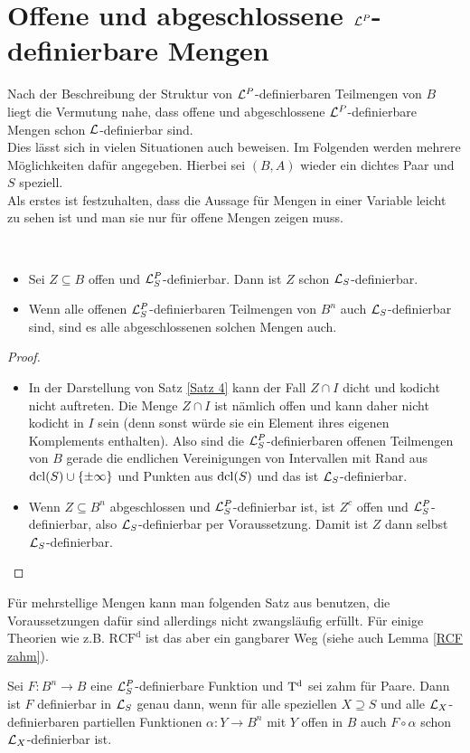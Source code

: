 \section{Offene und abgeschlossene $\mathcal{L}^P$-definierbare Mengen}
Nach der Beschreibung der Struktur von $\mathcal{L}^P$-definierbaren Teilmengen von $B$ liegt die Vermutung nahe, dass offene und abgeschlossene $\mathcal{L}^P$-definierbare Mengen schon $\mathcal{L}$-definierbar sind.\\
Dies lässt sich in vielen Situationen auch beweisen. Im Folgenden werden mehrere Möglichkeiten dafür angegeben. Hierbei sei $(B,A)$ wieder ein dichtes Paar und $S$ speziell.\\
Als erstes ist festzuhalten, dass die Aussage für Mengen in einer Variable leicht zu sehen ist und man sie nur für offene Mengen zeigen muss.
\newpage
\begin{lemma}\label{Offenheit einfache Fälle}\ 
	\begin{itemize}
		\item Sei $Z\subseteq B$ offen und $\mathcal{L}^P_S$-definierbar. Dann ist $Z$ schon $\mathcal{L}_S$-definierbar.
		\item Wenn alle offenen $\mathcal{L}^P_S$-definierbaren Teilmengen von $B^n$ auch $\mathcal{L}_S$-definierbar sind, sind es alle abgeschlossenen solchen Mengen auch.
	\end{itemize}
\end{lemma}
\begin{proof}\ 
	\begin{itemize}
		\item In der Darstellung von Satz \ref{Satz 4} kann der Fall $Z\cap I$ dicht und kodicht nicht auftreten. Die Menge $Z\cap I$ ist nämlich offen und kann daher nicht kodicht in $I$ sein (denn sonst würde sie ein Element ihres eigenen Komplements enthalten). Also sind die $\mathcal{L}^P_S$-definierbaren offenen Teilmengen von $B$ gerade die endlichen Vereinigungen von Intervallen mit Rand aus $\operatorname{dcl}(S)\cup\{\pm\infty\}$ und Punkten aus $\operatorname{dcl}(S)$ und das ist $\mathcal{L}_S$-definierbar.
		\item Wenn $Z\subseteq B^n$ abgeschlossen und $\mathcal{L}^P_S$-definierbar ist, ist $Z^c$ offen und $\mathcal{L}^P_S$-definierbar, also $\mathcal{L}_S$-definierbar per Voraussetzung. Damit ist $Z$ dann selbst $\mathcal{L}_S$-definierbar.
	\end{itemize}
\end{proof}


Für mehrstellige Mengen kann man folgenden Satz aus \cite{Piz} benutzen, die Voraussetzungen dafür sind allerdings nicht zwangsläufig erfüllt. Für einige Theorien wie z.B. $\operatorname{RCF^d}$ ist das aber ein gangbarer Weg (siehe auch Lemma \ref{RCF zahm}).
\begin{theorem}\label{Kurven}
	Sei $F:B^n\rightarrow B$ eine $\mathcal{L}^P_S$-definierbare Funktion und $\operatorname{T^d}$ sei zahm für Paare. Dann ist $F$ definierbar in $\mathcal{L}_S$ genau dann, wenn für alle speziellen $X\supseteq S$ und alle $\mathcal{L}_X$-definierbaren partiellen Funktionen $\alpha: Y\rightarrow B^n$ mit $Y$ offen in $B$ auch $F\circ\alpha$ schon $\mathcal{L}_X$-definierbar ist.
\end{theorem}

